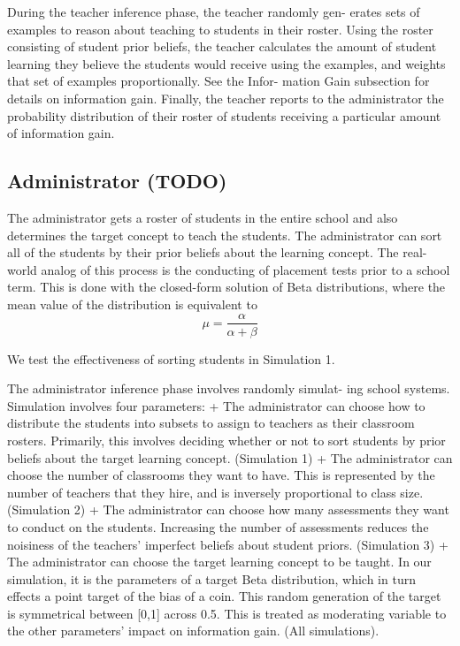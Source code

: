 \documentclass[10pt, letterpaper]{article}
\begin{document}
During the teacher inference phase, the teacher randomly gen- erates
sets of examples to reason about teaching to students in their roster.
Using the roster consisting of student prior beliefs, the teacher
calculates the amount of student learning they believe the students
would receive using the examples, and weights that set of examples
proportionally. See the Infor- mation Gain subsection for details on
information gain. Finally, the teacher reports to the administrator the
probability distribution of their roster of students receiving a
particular amount of information gain.

\subsection{Administrator (TODO)}\label{administrator-todo}

The administrator gets a roster of students in the entire school and
also determines the target concept to teach the students. The
administrator can sort all of the students by their prior beliefs about
the learning concept. The real-world analog of this process is the
conducting of placement tests prior to a school term. This is done with
the closed-form solution of Beta distributions, where the mean value of
the distribution is equivalent to
\[\mu = \frac{\alpha}{\alpha + \beta}\]

We test the effectiveness of sorting students in Simulation 1.

The administrator inference phase involves randomly simulat- ing school
systems. Simulation involves four parameters: + The administrator can
choose how to distribute the students into subsets to assign to teachers
as their classroom rosters. Primarily, this involves deciding whether or
not to sort students by prior beliefs about the target learning concept.
(Simulation 1) + The administrator can choose the number of classrooms
they want to have. This is represented by the number of teachers that
they hire, and is inversely proportional to class size. (Simulation 2) +
The administrator can choose how many assessments they want to conduct
on the students. Increasing the number of assessments reduces the
noisiness of the teachers' imperfect beliefs about student priors.
(Simulation 3) + The administrator can choose the target learning
concept to be taught. In our simulation, it is the parameters of a
target Beta distribution, which in turn effects a point target of the
bias of a coin. This random generation of the target is symmetrical
between {[}0,1{]} across 0.5. This is treated as moderating variable to
the other parameters' impact on information gain. (All simulations).
\end{document}

